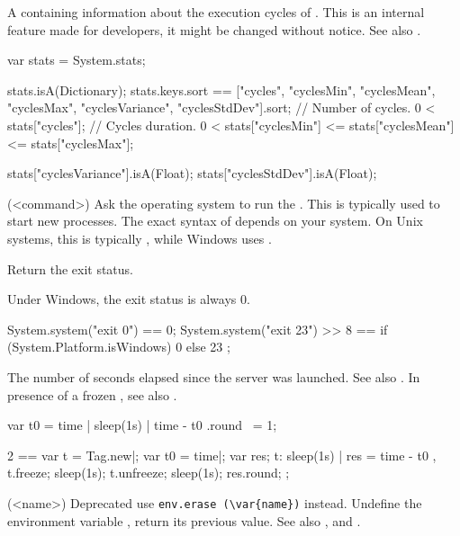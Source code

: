 \begin{urbiscriptapi}
\item[stats]%
  A  containing information about the execution
  cycles of \urbi.  This is an internal feature made for developers, it
  might be changed without notice.  See also .
\begin{urbiassert}
var stats = System.stats;

stats.isA(Dictionary);
stats.keys.sort == ["cycles",
                    "cyclesMin", "cyclesMean", "cyclesMax",
                    "cyclesVariance", "cyclesStdDev"].sort;
// Number of cycles.
0 < stats["cycles"];
// Cycles duration.
0 < stats["cyclesMin"] <= stats["cyclesMean"] <= stats["cyclesMax"];

stats["cyclesVariance"].isA(Float);
stats["cyclesStdDev"].isA(Float);
\end{urbiassert}




\item[system](<command>)%
  Ask the operating system to run the .  This is typically used
  to start new processes.  The exact syntax of  depends on your
  system.  On Unix systems, this is typically , while Windows
  uses .

  Return the exit status.

  \begin{windows}
    Under Windows, the exit status is always 0.
  \end{windows}

\begin{urbiassert}
System.system("exit 0") == 0;
System.system("exit 23") >> 8
       == { if (System.Platform.isWindows) 0 else 23 };
\end{urbiassert}


\item[time] The number of seconds elapsed since the \urbi server was
  launched.  See also .  In presence of a frozen
  , see also .
\begin{urbiassert}
{ var t0 = time | sleep(1s) | time - t0 }.round ~= 1;

  2 ==
  {
    var t = Tag.new|;
    var t0 = time|;
    var res;
    t: { sleep(1s) | res = time - t0 },
    t.freeze;
    sleep(1s);
    t.unfreeze;
    sleep(1s);
    res.round;
  };
\end{urbiassert}


\item[unsetenv](<name>)%
  Deprecated use \lstinline|env.erase (\var{name})| instead.
  Undefine the environment variable , return its previous value.
  See also ,  and .


\end{urbiscriptapi}
